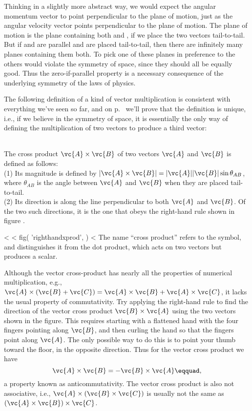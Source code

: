 Thinking in a slightly more abstract way, we would expect
the angular momentum vector to point perpendicular to the
plane of motion, just as the angular velocity vector points
perpendicular to the plane of motion. The plane of motion is
the plane containing both  and , if we place the two
vectors tail-to-tail. But if  and  are parallel and are
placed tail-to-tail, then there are infinitely many planes
containing them both. To pick one of these planes in
preference to the others would violate the symmetry of
space, since they should all be equally good. Thus the
zero-if-parallel property is a necessary consequence of the
underlying symmetry of the laws of physics.

The following definition of a kind of vector multiplication
is consistent with everything we've seen so far, and on p.~\pageref{misc:uniquexproof}
 we'll prove that the definition is unique, i.e., if
we believe in the symmetry of space, it is essentially the
only way of defining the multiplication of two vectors to
produce a third vector:

\enlargethispage{-2\baselineskip}

\\
The cross product $\vc{A}\times\vc{B}$ of two vectors $\vc{A}$ and $\vc{B}$ is defined as
follows:\\
(1) Its magnitude is defined by $|\vc{A}\times\vc{B}| = |\vc{A}| |\vc{B}| \sin\theta_{AB}$,
where $\theta_{AB}$ is the angle between $\vc{A}$ and $\vc{B}$ when they are placed
tail-to-tail.\\
(2) Its direction is along the line perpendicular to both $\vc{A}$ and $\vc{B}$.
Of the two such directions, it is the one that obeys
the right-hand rule shown in  figure .\label{vectorcrossproductdef}

<%
<%
  fig(
    'righthandxprod',
  )
<%
The name ``cross product'' refers to the  symbol, and
distinguishes it from the dot product, which acts on two
vectors but produces a scalar.

Although the vector cross-product has nearly all the
properties of numerical multiplication, e.g.,
 $\vc{A}\times(\vc{B}+\vc{C}) = \vc{A}\times\vc{B}+\vc{A}\times\vc{C}$,
it lacks the usual property of commutativity. Try applying
the right-hand rule to find the direction of the vector
cross product $\vc{B}\times\vc{A}$ using the two vectors shown in the figure.
This requires starting with a flattened hand with the four
fingers pointing along $\vc{B}$, and then curling the hand so that
the fingers point along $\vc{A}$. The only possible way to do this
is to point your thumb toward the floor, in the opposite
direction. Thus for the vector cross product we have
\begin{equation*}
        \vc{A}\times\vc{B} = -\vc{B}\times\vc{A}\eqquad,
\end{equation*}
a property known as anticommutativity. The vector cross
product is also not associative, i.e.,
 $\vc{A}\times(\vc{B}\times\vc{C})$ is usually not
the same as  $(\vc{A}\times\vc{B})\times\vc{C}$.

